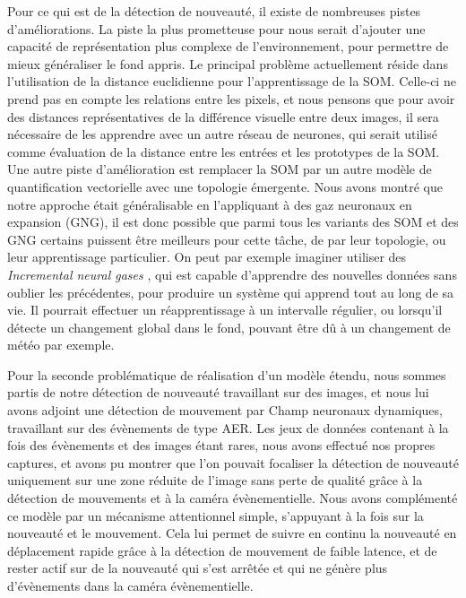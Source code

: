 Pour ce qui est de la détection de nouveauté, il existe de nombreuses pistes d'améliorations. La piste la plus prometteuse pour nous serait d'ajouter une capacité de représentation plus complexe de l'environnement, pour permettre de mieux généraliser le fond appris. Le principal problème actuellement réside dans l'utilisation de la distance euclidienne pour l'apprentissage de la SOM. Celle-ci ne prend pas en compte les relations entre les pixels, et nous pensons que pour avoir des distances représentatives de la différence visuelle entre deux images, il sera nécessaire de les apprendre avec un autre réseau de neurones, qui serait utilisé comme évaluation de la distance entre les entrées et les prototypes de la SOM. Une autre piste d'amélioration est remplacer la SOM par un autre modèle de quantification vectorielle avec une topologie émergente. Nous avons montré que notre approche était généralisable en l'appliquant à des gaz neuronaux en expansion (GNG), il est donc possible que parmi tous les variants des SOM et des GNG certains puissent être meilleurs pour cette tâche, de par leur topologie, ou leur apprentissage particulier. On peut par exemple imaginer utiliser des \textit{Incremental neural gases} \cite{prudent2005incremental}, qui est capable d'apprendre des nouvelles données sans oublier les précédentes, pour produire un système qui apprend tout au long de sa vie. Il pourrait effectuer un réapprentissage à un intervalle régulier, ou lorsqu'il détecte un changement global dans le fond, pouvant être dû à un changement de météo par exemple.

Pour la seconde problématique de réalisation d'un modèle étendu, nous sommes partis de notre détection de nouveauté travaillant sur des images, et nous lui avons adjoint une détection de mouvement par Champ neuronaux dynamiques, travaillant sur des évènements de type AER. Les jeux de données contenant à la fois des évènements et des images étant rares, nous avons effectué nos propres captures, et avons pu montrer que l'on pouvait focaliser la détection de nouveauté uniquement sur une zone réduite de l'image sans perte de qualité grâce à la détection de mouvements et à la caméra évènementielle. Nous avons complémenté ce modèle par un mécanisme attentionnel simple, s'appuyant à la fois sur la nouveauté et le mouvement. Cela lui permet de suivre en continu la nouveauté en déplacement rapide grâce à la détection de mouvement de faible latence, et de rester actif sur de la nouveauté qui s'est arrêtée et qui ne génère plus d'évènements dans la caméra évènementielle.

